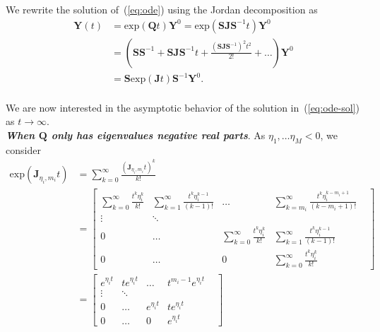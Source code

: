 We rewrite the solution of~(\ref{eq:ode}) using the Jordan decomposition as
\begin{equation}
\label{eq:ode-sol}
    \begin{aligned}
        \bm{Y}(t) &= \mathrm{exp}(\bm{Q}t)\bm{Y}^0 = \mathrm{exp}(\bm{S}\bm{J}\bm{S}^{-1}t)\bm{Y}^0\\
        & = (\bm{S}\bm{S}^{-1} + \bm{S}\bm{J}\bm{S}^{-1}t + \frac{(\bm{S}\bm{J}\bm{S}^{-1})^2t^2}{2!} + \dots)\bm{Y}^0\\
        & = \bm{S}\mathrm{exp}(\bm{J}t)\bm{S}^{-1}\bm{Y}^0.
    \end{aligned}
\end{equation}
\\
We are now interested in the asymptotic behavior of the solution in~(\ref{eq:ode-sol}) as $t \rightarrow \infty$.\\
\textit{\textbf{When $\bm{Q}$ only has eigenvalues negative real parts}}. As $\eta_1, \dots \eta_M < 0$, we consider
\begin{equation}
    \begin{aligned}
        \mathrm{exp}(\bm{J}_{\eta_i, m_i}t) &= \sum_{k = 0}^{\infty}\frac{(\bm{J}_{\eta_i, m_i}t)^k}{k!}\\
        & = \begin{bmatrix}
            \displaystyle \sum_{k = 0}^{\infty} \frac{t^k\eta_i^{k}}{k!} & \displaystyle \sum_{k = 1}^{\infty} \frac{t^k\eta_i^{k - 1}}{(k - 1)!} & \dots & \displaystyle \sum_{k = m_i}^{\infty} \frac{t^k\eta_i^{k - m_i + 1}}{(k - m_i + 1)!}\\
            \vdots & \ddots & & &\\
            0&\dots & \displaystyle \sum_{k = 0}^{\infty} \frac{t^k\eta_i^{k}}{k!} & \displaystyle \sum_{k = 1}^{\infty} \frac{t^k\eta_i^{k - 1}}{(k - 1)!}\\
            0& \dots & 0 & \displaystyle \sum_{k = 0}^{\infty} \frac{t^k\eta_i^{k}}{k!}
        \end{bmatrix}\\
        &= \begin{bmatrix}
            e^{\eta_it} & te^{\eta_it} & \dots & t^{m_i - 1}e^{\eta_it}\\
            \vdots & \ddots & & &\\
            0&\dots & e^{\eta_it} & te^{\eta_it}\\
            0& \dots & 0 & e^{\eta_it}
        \end{bmatrix}\\
    \end{aligned}
\end{equation}
